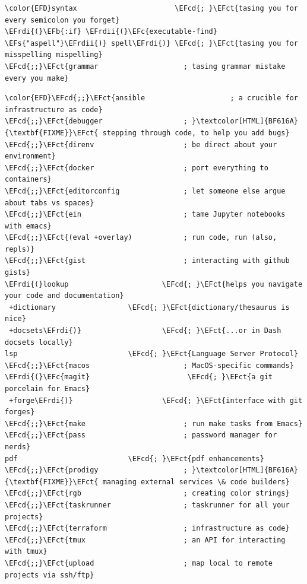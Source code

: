 \documentclass{scrartcl}
\newcommand{\EFs}[1]{\textcolor{EFs}{#1}} %
\newcommand{\EFb}[1]{\textcolor{EFb}{#1}} %
\newcommand{\EFct}[1]{\textcolor{EFct}{#1}} %
\newcommand{\EFc}[1]{\textcolor{EFc}{#1}} %
\newcommand{\EFcd}[1]{\textcolor{EFcd}{#1}} %
\newcommand{\EFrdi}[1]{#1} %
\newcommand{\EFrdii}[1]{#1} %
\begin{document}
\begin{enumerate}
\begin{Code}
\begin{Verbatim}[]
\color{EFD}syntax                       \EFcd{; }\EFct{tasing you for every semicolon you forget}
\EFrdi{(}\EFb{:if} \EFrdii{(}\EFc{executable-find} \EFs{"aspell"}\EFrdii{)} spell\EFrdi{)} \EFcd{; }\EFct{tasing you for misspelling mispelling}
\EFcd{;;}\EFct{grammar                    ; tasing grammar mistake every you make}
\end{Verbatim}
\end{Code}

\begin{Code}
\begin{Verbatim}[]
\color{EFD}\EFcd{;;}\EFct{ansible                    ; a crucible for infrastructure as code}
\EFcd{;;}\EFct{debugger                   ; }\textcolor[HTML]{BF616A}{\textbf{FIXME}}\EFct{ stepping through code, to help you add bugs}
\EFcd{;;}\EFct{direnv                     ; be direct about your environment}
\EFcd{;;}\EFct{docker                     ; port everything to containers}
\EFcd{;;}\EFct{editorconfig               ; let someone else argue about tabs vs spaces}
\EFcd{;;}\EFct{ein                        ; tame Jupyter notebooks with emacs}
\EFcd{;;}\EFct{(eval +overlay)            ; run code, run (also, repls)}
\EFcd{;;}\EFct{gist                       ; interacting with github gists}
\EFrdi{(}lookup                      \EFcd{; }\EFct{helps you navigate your code and documentation}
 +dictionary                 \EFcd{; }\EFct{dictionary/thesaurus is nice}
 +docsets\EFrdi{)}                   \EFcd{; }\EFct{...or in Dash docsets locally}
lsp                          \EFcd{; }\EFct{Language Server Protocol}
\EFcd{;;}\EFct{macos                      ; MacOS-specific commands}
\EFrdi{(}\EFc{magit}                       \EFcd{; }\EFct{a git porcelain for Emacs}
 +forge\EFrdi{)}                     \EFcd{; }\EFct{interface with git forges}
\EFcd{;;}\EFct{make                       ; run make tasks from Emacs}
\EFcd{;;}\EFct{pass                       ; password manager for nerds}
pdf                          \EFcd{; }\EFct{pdf enhancements}
\EFcd{;;}\EFct{prodigy                    ; }\textcolor[HTML]{BF616A}{\textbf{FIXME}}\EFct{ managing external services \& code builders}
\EFcd{;;}\EFct{rgb                        ; creating color strings}
\EFcd{;;}\EFct{taskrunner                 ; taskrunner for all your projects}
\EFcd{;;}\EFct{terraform                  ; infrastructure as code}
\EFcd{;;}\EFct{tmux                       ; an API for interacting with tmux}
\EFcd{;;}\EFct{upload                     ; map local to remote projects via ssh/ftp}
\end{Verbatim}
\end{Code}


\end{enumerate}
\end{document}
